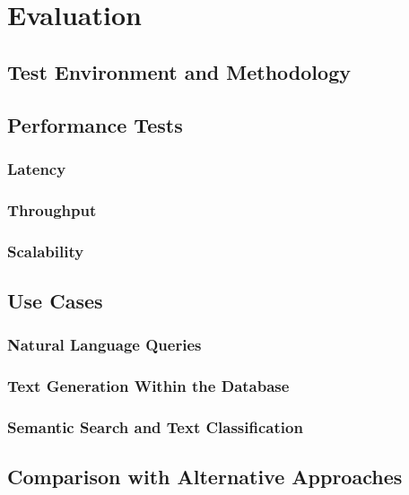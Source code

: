 \documentclass{article}
\begin{document}
\newpage

\section{Evaluation}


\subsection{Test Environment and Methodology}

\subsection{Performance Tests}
\subsubsection{Latency}
\subsubsection{Throughput}
\subsubsection{Scalability}

\subsection{Use Cases}
\subsubsection{Natural Language Queries}
\subsubsection{Text Generation Within the Database}
\subsubsection{Semantic Search and Text Classification}

\subsection{Comparison with Alternative Approaches}

\newpage
\end{document}
